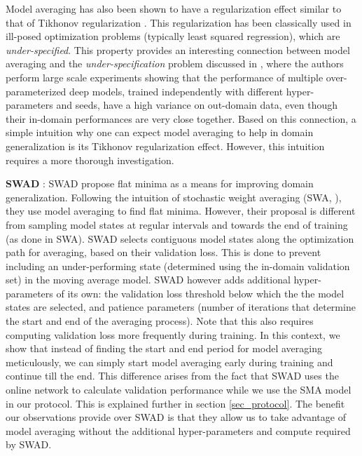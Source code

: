 \documentclass{article}
\begin{document}
Model averaging has also been shown to have a regularization effect \cite{neu2018iterate} similar to that of Tikhonov regularization \cite{tikhonov1943stability}. This regularization has been classically used in ill-posed optimization problems (typically least squared regression), which are \textit{under-specified}. This property provides an interesting connection between model averaging and the \textit{under-specification} problem discussed in \cite{d2020underspecification}, where the authors perform large scale experiments showing that the performance of multiple over-parameterized deep models, trained independently with different hyper-parameters and seeds, have a high variance on out-domain data, even though their in-domain performances are very close together. Based on this connection, a simple intuition why one can expect model averaging to help in domain generalization is its Tikhonov regularization effect. However, this intuition requires a more thorough investigation.

\textbf{SWAD} \cite{cha2021swad}: SWAD propose flat minima as a means for improving domain generalization. Following the intuition of stochastic weight averaging (SWA, \cite{izmailov2018averaging}), they use model averaging to find flat minima. However, their proposal is different from sampling model states at regular intervals and towards the end of training (as done in SWA). SWAD selects contiguous model states along the optimization path for averaging, based on their validation loss. This is done to prevent including an under-performing state (determined using the in-domain validation set) in the moving average model. SWAD however adds additional hyper-parameters of its own: the validation loss threshold below which the the model states are selected, and patience parameters (number of iterations that determine the start and end of the averaging process). Note that this also requires computing validation loss more frequently during training. In this context, we show that instead of finding the start and end period for model averaging meticulously, we can simply start model averaging early during training and continue till the end. This difference arises from the fact that SWAD uses the online network to calculate validation performance while we use the SMA model in our protocol. This is explained further in section \ref{sec_protocol}. The benefit our observations provide over SWAD is that they allow us to take advantage of model averaging without the additional hyper-parameters and compute required by SWAD.
\end{document}
